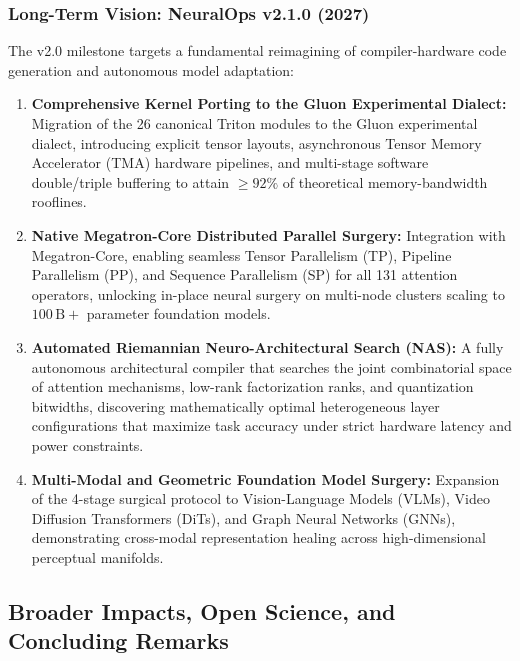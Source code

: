 \subsubsection{Long-Term Vision: NeuralOps v2.1.0 (2027)}
\label{subsubsec:roadmap_v20}

The v2.0 milestone targets a fundamental reimagining of compiler-hardware code generation and autonomous model adaptation:
\begin{enumerate}
    \item \textbf{Comprehensive Kernel Porting to the Gluon Experimental Dialect:}
    Migration of the 26 canonical Triton modules to the Gluon experimental dialect, introducing explicit tensor layouts, asynchronous Tensor Memory Accelerator (TMA) hardware pipelines, and multi-stage software double/triple buffering to attain $\ge 92\%$ of theoretical memory-bandwidth rooflines.
    \item \textbf{Native Megatron-Core Distributed Parallel Surgery:}
    Integration with Megatron-Core, enabling seamless Tensor Parallelism (TP), Pipeline Parallelism (PP), and Sequence Parallelism (SP) for all 131 attention operators, unlocking in-place neural surgery on multi-node clusters scaling to $100\,\text{B}+$ parameter foundation models.
    \item \textbf{Automated Riemannian Neuro-Architectural Search (NAS):}
    A fully autonomous architectural compiler that searches the joint combinatorial space of attention mechanisms, low-rank factorization ranks, and quantization bitwidths, discovering mathematically optimal heterogeneous layer configurations that maximize task accuracy under strict hardware latency and power constraints.
    \item \textbf{Multi-Modal and Geometric Foundation Model Surgery:}
    Expansion of the 4-stage surgical protocol to Vision-Language Models (VLMs), Video Diffusion Transformers (DiTs), and Graph Neural Networks (GNNs), demonstrating cross-modal representation healing across high-dimensional perceptual manifolds.
\end{enumerate}

\subsection{Broader Impacts, Open Science, and Concluding Remarks}
\label{subsec:broader_impacts_conclusion}

